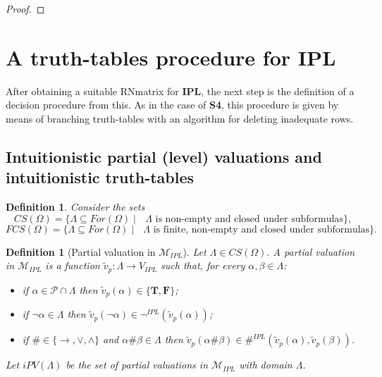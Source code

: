 \documentclass[12pt]{article}
\newtheorem{definition}[theorem]{Definition}
\newcommand{\bT}{\mathbf{T}}
\newcommand{\bF}{\mathbf{F}}
\newcommand{\ipl}{\ensuremath{\mathbf{IPL}}}
\newcommand{\sfo}{\textbf{S4}}
\begin{document}
\begin{proof}
\end{proof}






\section{A truth-tables procedure  for \ipl} \label{tables-IPL}

After obtaining a suitable RNmatrix for \ipl, the next step  is the definition of a decision procedure from this. As in the case of \sfo, this procedure is given  by means of branching truth-tables with an algorithm for deleting inadequate rows.

\subsection{Intuitionistic partial (level) valuations and intuitionistic truth-tables} \label{sect:Int_truth_tables}


\begin{definition} Consider the sets 
$$CS(\Omega)= \{\Lambda \subseteq For(\Omega) \mid  \mbox{ $\Lambda$ is non-empty and closed under subformulas}\},$$
 $$FCS(\Omega)= \{\Lambda \subseteq For(\Omega) \mid  \mbox{ $\Lambda$ is finite, non-empty and closed under subformulas}\}.$$
\end{definition}


\begin{definition}[Partial valuation  in $\mathcal{M}_{IPL}$]\label{def:partial_valuationIPL}
 Let $\Lambda \in CS(\Omega)$.  A {\em partial valuation in $\mathcal{M}_{IPL}$} is a function $\tilde v_p :\Lambda \rightarrow V_{IPL}$ such that, for every $\alpha,\beta \in \Lambda$:
 
 \begin{itemize}
 \item[--] if $\alpha \in \mathcal{P} \cap \Lambda$ then $\tilde v_p(\alpha) \in \{\bT,\bF\}$;
 \item[--] if $\neg\alpha \in \Lambda$ then $\tilde v_p(\neg \alpha) \in \neg^{IPL}(\tilde v_p(\alpha))$;
 \item[--] if  $\# \in \{\to,\vee,\land\}$ and $\alpha \# \beta\in \Lambda$ then  $\tilde v_p(\alpha \# \beta) \in \#^{IPL}(\tilde v_p(\alpha),\tilde v_p(\beta))$.
 \end{itemize}
 Let $iPV(\Lambda)$ be the set of  partial valuations in $\mathcal{M}_{IPL}$ with domain $\Lambda$.
\end{definition}
\end{document}
